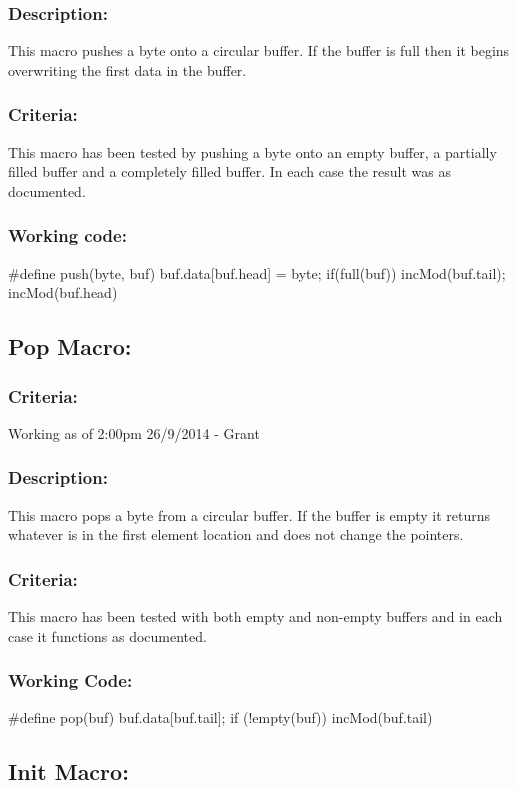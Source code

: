 \documentclass[]{article}
\begin{document}
\subsubsection{Description:}
This macro pushes a byte onto a circular buffer. If the buffer is full then it begins overwriting the first data in the buffer.

\subsubsection{Criteria:}
This macro has been tested by pushing a byte onto an empty buffer, a partially filled buffer and a completely filled buffer. In each case the result was as documented.

\subsubsection{Working code:}
\#define push(byte, buf) buf.data[buf.head] = byte; if(full(buf)) incMod(buf.tail); incMod(buf.head)

\subsection{Pop Macro:}
\subsubsection{Criteria:}
Working as of 2:00pm 26/9/2014 - Grant

\subsubsection{Description:}
This macro pops a byte from a circular buffer. If the buffer is empty it returns whatever is in the first element location and does not change the pointers.

\subsubsection{Criteria:}
This macro has been tested with both empty and non-empty buffers and in each case it functions as documented.

\subsubsection{Working Code:}
\#define pop(buf) buf.data[buf.tail]; if (!empty(buf)) incMod(buf.tail)

\subsection{Init Macro:}
\end{document}
